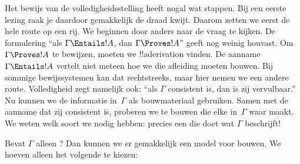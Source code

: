 \documentclass[openany]{memoir}
\begin{document}
\begingroup
\def\olfilename{OLP-0128}
\def\olfilepath{content/first-order-logic/completeness/}
\hypertarget{unit-OLP-0128}{}



      {}
      {}


Het bewijs van de volledigheidsstelling heeft nogal wat stappen. Bij
een eerste lezing raak je daardoor gemakkelijk de draad kwijt. Daarom
zetten we eerst de hele route op een rij. We beginnen door anders naar
de vraag te kijken. De formulering ``als $\Gamma \Entails !A$, dan
$\Gamma \Proves !A$'' geeft nog weinig houvast. Om
$\Gamma \Proves !A$ te bewijzen, moeten we !!a{derivation} vinden. De
aanname $\Gamma \Entails !A$ vertelt niet meteen hoe we die afleiding
moeten bouwen. Bij sommige bewijssystemen kan dat rechtstreeks, maar
hier nemen we een andere route. Volledigheid zegt namelijk ook: ``als
$\Gamma$ consistent is, dan is zij vervulbaar.'' Nu kunnen we de
informatie in~$\Gamma$ als bouwmateriaal gebruiken. Samen met de
aanname dat zij consistent is, proberen we
 te bouwen die elke
 in~$\Gamma$ waar maakt. We weten
welk soort  we nodig hebben:
precies een die doet wat $\Gamma$ beschrijft!{}

Bevat $\Gamma$ alleen ? Dan kunnen we er
gemakkelijk een model voor bouwen. We hoeven alleen het volgende te kiezen:
\end{document}
